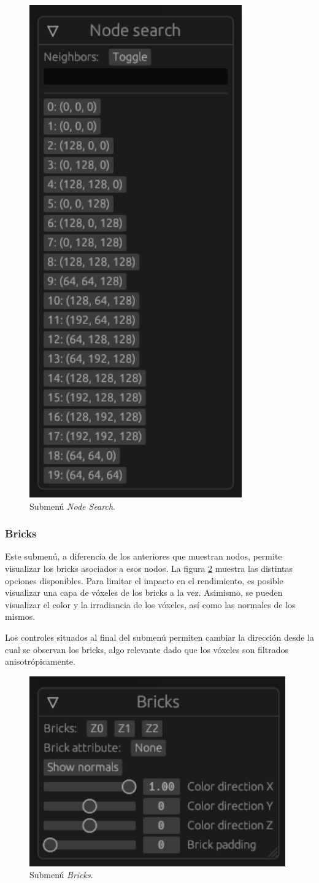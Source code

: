 \begin{figure}[h]
    \centering
    \includegraphics[width=.5\textwidth]{node_search.png}
    \caption{Submenú \textit{Node Search}.}
    \label{fig:node_search}
\end{figure}

\subsubsection{Bricks}

Este submenú, a diferencia de los anteriores que muestran nodos, permite visualizar los bricks asociados a esos nodos. La figura \ref{fig:bricks} muestra las distintas opciones disponibles. Para limitar el impacto en el rendimiento, es posible visualizar una capa de vóxeles de los bricks a la vez. Asimismo, se pueden visualizar el color y la irradiancia de los vóxeles, así como las normales de los mismos.

Los controles situados al final del submenú permiten cambiar la dirección desde la cual se observan los bricks, algo relevante dado que los vóxeles son filtrados anisotrópicamente.

\begin{figure}[h]
    \centering
    \includegraphics[width=.5\textwidth]{bricks.png}
    \caption{Submenú \textit{Bricks}.}
    \label{fig:bricks}
\end{figure}

